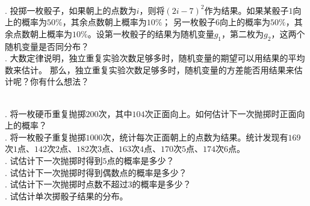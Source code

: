 \documentclass[12pt,UTF8]{ctexbook}
\begin{document}
\begin{sk}
    \mbox{}\\
    . 投掷一枚骰子，如果朝上的点数为$i$，则将$(2i-7)^2$作为结果。如果某骰子$1$向上的概率为$50\%$，其余点数朝上概率为$10\%$；
    另一枚骰子$6$向上的概率为$50\%$，其余点数朝上概率为$10\%$。设第一枚骰子的结果为随机变量$g_1$，第二枚为$g_2$，这两个随机变量是否同分布？\\
    . 大数定律说明，独立重复实验次数足够多时，随机变量的期望可以用结果的平均数来估计。
    那么，独立重复实验次数足够多时，随机变量的方差能否用结果来估计呢？你有什么想法？
\end{sk}

\begin{xt}
    \mbox{}\\
    . 将一枚硬币重复抛掷$200$次，其中$104$次正面向上。如何估计下一次抛掷时正面向上的概率？\\
    . 将一枚骰子重复抛掷$1000$次，统计每次正面朝上的点数为结果。统计发现有$169$次$1$点、$142$次$2$点、$182$次$3$点、$163$次$4$点、$170$次$5$点、$174$次$6$点。\\
    . 试估计下一次抛掷时得到$5$点的概率是多少？\\
    . 试估计下一次抛掷时得到偶数点的概率是多少？\\
    . 试估计下一次抛掷时点数不超过$3$的概率是多少？\\
    . 试估计单次掷骰子结果的分布。
\end{xt}
\end{document}
